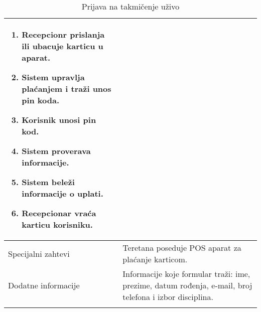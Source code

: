 \documentclass[../../main.tex]{subfiles}
\begin{document}
\begin{longtable}{| p{} | p{} |}
\begin{itemize}
\begin{enumerate}
            \item Recepcionr prislanja ili ubacuje karticu u aparat.
            \item Sistem upravlja plaćanjem i traži unos pin koda.
            \item Korisnik unosi pin kod.
            \item Sistem proverava informacije.
            \item Sistem beleži informacije o uplati.
            \item Recepcionar vraća karticu korisniku.	
        \end{enumerate}
    \end{itemize}\\
\hline
    Specijalni zahtevi & Teretana poseduje POS aparat za plaćanje karticom.\\
\hline
    Dodatne informacije & Informacije koje formular traži: ime, prezime, datum rođenja, e-mail, broj telefona i izbor disciplina.\\
\hline
\caption{Prijava na takmičenje uživo} %
\end{longtable}
\end{document}
